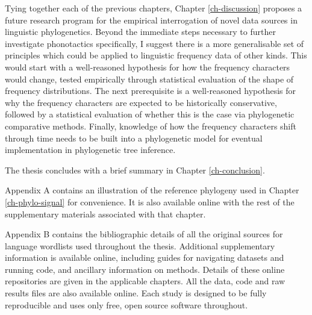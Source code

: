 Tying together each of the previous chapters, Chapter \ref{ch-discussion} proposes a future research program for the empirical interrogation of novel data sources in linguistic phylogenetics. Beyond the immediate steps necessary to further investigate phonotactics specifically, I suggest there is a more generalisable set of principles which could be applied to linguistic frequency data of other kinds. This would start with a well-reasoned hypothesis for how the frequency characters would change, tested empirically through statistical evaluation of the shape of frequency distributions. The next prerequisite is a well-reasoned hypothesis for why the frequency characters are expected to be historically conservative, followed by a statistical evaluation of whether this is the case via phylogenetic comparative methods. Finally, knowledge of how the frequency characters shift through time needs to be built into a phylogenetic model for eventual implementation in phylogenetic tree inference.

The thesis concludes with a brief summary in Chapter \ref{ch-conclusion}.

Appendix A contains an illustration of the reference phylogeny used in Chapter \ref{ch-phylo-signal} for convenience. It is also available online with the rest of the supplementary materials associated with that chapter.

Appendix B contains the bibliographic details of all the original sources for language wordlists used throughout the thesis. Additional supplementary information is available online, including guides for navigating datasets and running code, and ancillary information on methods. Details of these online repositories are given in the applicable chapters. All the data, code and raw results files are also available online. Each study is designed to be fully reproducible and uses only free, open source software throughout.

